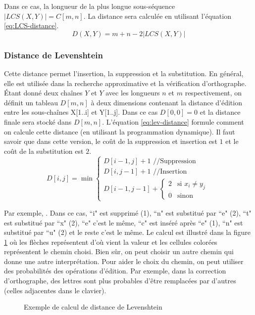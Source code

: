 \documentclass{KodeBook}
\begin{document}
Dans ce cas, la longueur de la plus longue sous-séquence $|LCS(X, Y)| = C[m, n]$.
La distance sera calculée en utilisant l'équation \ref{eq:LCS-distance}.
\begin{equation}
	D(X, Y) = m + n - 2 |LCS(X, Y)|
	\label{eq:LCS-distance}
\end{equation}

\subsubsection{Distance de Levenshtein}

Cette distance permet l'insertion, la suppression et la substitution.
En général, elle est utilisée dans la recherche approximative et la vérification d'orthographe.
Étant donné deux chaînes $Y$ et $Y$ avec les longueurs $n$ et $m$ respectivement, on définit un tableau $D[m, n]$ à deux dimensions contenant la distance d'édition entre les sous-chaînes X[1..i] et Y[1..j]. 
Dans ce cas $D[0, 0] = 0$ et la distance finale sera stocké dans $D[m, n]$.
L'équation \ref{eq:lev-distance} formule comment on calcule cette distance (en utilisant la programmation dynamique).
Il faut savoir que dans cette version, le coût de la suppression et insertion est $1$ et le coût de la substitution est $2$.
\begin{equation}
	D[i, j] = \min 
	\begin{cases}
		D[i - 1, j] + 1 \text{ //Suppression}\\
		D[i, j-1] + 1 \text{ //Insertion}\\
		D[i-1, j-1] + \begin{cases}
			2 & \text{si } x_i \ne y_j \\
			0 & \text{sinon}
		\end{cases}
	\end{cases}
	\label{eq:lev-distance}
\end{equation}

Par exemple, . 
Dans ce cas, ``i" est supprimé (1), ``n" est substitué par ``e" (2), ``t" est substitué par ``x" (2), ``e" c'est le même, ``c" est inséré après ``e" (1), ``n" est substitué par ``u" (2) et le reste c'est le même.
Le calcul est illustré dans la figure \ref{fig:laven-distance} où les flèches représentent d'où vient la valeur et les cellules colorées représentent le chemin choisi.
Bien sûr, on peut choisir un autre chemin qui donne une autre interprétation.
Pour aider le choix du chemin, on peut utiliser des probabilités des opérations d'édition.
Par exemple, dans la correction d'orthographe, des lettres sont plus probables d'être remplacées par d'autres (celles adjacentes dans le clavier).
\begin{figure}[ht]
	\centering
	\caption[Exemple de calcul de distance de Levenshtein]{Exemple de calcul de distance de Levenshtein \cite{2019-jurafsky-martin} \label{fig:laven-distance}}
\end{figure}
\end{document}
